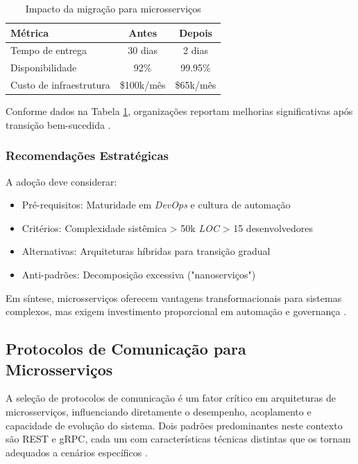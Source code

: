 \begin{table}[h]
\centering
\caption{Impacto da migração para microsserviços}
\begin{tabular}{|l|c|c|}
\hline
Métrica & Antes & Depois \\
\hline
Tempo de entrega & 30 dias & 2 dias \\
Disponibilidade & 92\% & 99.95\% \\
Custo de infraestrutura & \$100k/mês & \$65k/mês \\
\hline
\end{tabular}
\label{tab:impacto}
\end{table}

Conforme dados na Tabela \ref{tab:impacto}, organizações reportam melhorias significativas após transição bem-sucedida \cite{farhan2023performance, shekhar2023microservices}.

\subsubsection{Recomendações Estratégicas}
A adoção deve considerar:

\begin{itemize}
    \item Pré-requisitos: Maturidade em \textit{DevOps} e cultura de automação
    \item Critérios: Complexidade sistêmica > 50k \textit{LOC} > 15 desenvolvedores
    \item Alternativas: Arquiteturas híbridas para transição gradual
    \item Anti-padrões: Decomposição excessiva ("nanoserviços")
\end{itemize}

Em síntese, microsserviços oferecem vantagens transformacionais para sistemas complexos, mas exigem investimento proporcional em automação e governança \cite{nizami2020comparison, observability2023}.

\subsection{Protocolos de Comunicação para Microsserviços}
A seleção de protocolos de comunicação é um fator crítico em arquiteturas de microsserviços, influenciando diretamente o desempenho, acoplamento e capacidade de evolução do sistema. Dois padrões predominantes neste contexto são \gls{REST} e \gls{gRPC}, cada um com características técnicas distintas que os tornam adequados a cenários específicos \cite{niswar2023performance}.

